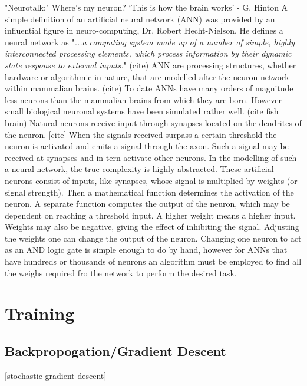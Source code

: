 "Neurotalk:"
Where’s my neuron?
‘This is how the brain works’ - G. Hinton
A simple definition of an artificial neural network (ANN) was provided by an influential figure in neuro-computing, Dr. Robert Hecht-Nielson.
He defines a neural network as "\textit{...a computing system made up of a number of simple, highly interconnected processing elements, which process information by their dynamic state response to external inputs.}" (cite)
ANN are processing structures, whether hardware or algorithmic in nature, that are modelled after the neuron network within mammalian brains. (cite)
To date ANNs have many orders of magnitude less neurons than the mammalian brains from which they are born.
However small biological neuronal systems have been simulated rather well. (cite fish brain)
Natural neurons receive input through synapses located on the dendrites of the neuron. [cite]
When the signals received surpass a certain threshold the neuron is activated and emits a signal through the axon.
Such a signal may be received at synapses and in tern activate other neurons.
In the modelling of such a neural network, the true complexity is highly abstracted.
These artificial neurons consist of inputs, like synapses, whose signal is multiplied by weights (or signal strength).
Then a mathematical function determines the activation of the neuron.
A separate function computes the output of the neuron, which may be dependent on reaching a threshold input.
A higher weight means a higher input.
Weights may also be negative, giving the effect of inhibiting the signal.
Adjusting the weights one can change the output of the neuron.
Changing one neuron to act as an AND logic gate is simple enough to do by hand, however for ANNs that have hundreds or thousands of neurons an algorithm must be employed to find all the weighs required fro the network to perform the desired task.



        
	\section{Training}
    
    
    
    	\subsection{Backpropogation/Gradient Descent}
        
        
        
[stochastic gradient descent]

